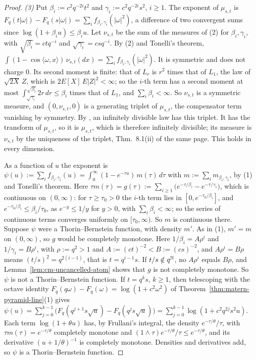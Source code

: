 \begin{proof}
\emph{(3)} Put $\beta_i := c^2q^{-2i}t^2$ and $\gamma_i := c^2q^{-2i}s^2$, $i \ge 1$. The exponent of
$\mu_{s,t}$ is $F_q(t|\omega|) - F_q(s|\omega|) = \sum_if_{\beta_i,\gamma_i}(|\omega|^2)$, a
difference of two convergent sums since $\log(1 + \beta_iu) \le \beta_iu$. Let $\nu_{s,t}$ be the
sum of the measures of (2) for $\beta_i, \gamma_i$, with $\sqrt{\beta_i} = ctq^{-i}$ and
$\sqrt{\gamma_i} = csq^{-i}$. By (2) and Tonelli's theorem,
$\int(1 - \cos\langle\omega, x\rangle)\,\nu_{s,t}(dx) = \sum_if_{\beta_i,\gamma_i}(|\omega|^2)$. It is
symmetric and does not charge $0$. Its second moment is finite: that of $L_r$ is $r^2$ times that of
$L_1$, the law of $\sqrt{2X}\,Z$, which is $2E[X]\,E|Z|^2 < \infty$; so the $i$-th term has a second
moment at most $\int_{\sqrt{\gamma_i}}^{\sqrt{\beta_i}}2r\,dr \le \beta_i$ times that of $L_1$, and
$\sum_i\beta_i < \infty$. So $\nu_{s,t}$ is a symmetric \Levy{} measure, and $(0, \nu_{s,t}, 0)$ is a
generating triplet of $\mu_{s,t}$, the compensator term vanishing by symmetry. By
, an infinitely divisible law has this
triplet. It has the transform of $\mu_{s,t}$, so it is $\mu_{s,t}$, which is therefore infinitely
divisible; its \Levy{} measure is $\nu_{s,t}$ by the uniqueness of the triplet, Thm.~8.1(ii) of the
same page. This holds in every dimension.

As a function of $u$ the exponent is $\psi(u) := \sum_if_{\beta_i,\gamma_i}(u) =
\int_0^\infty(1 - e^{-\tau u})\,m(\tau)\,d\tau$ with $m := \sum_im_{\beta_i,\gamma_i}$, by (1) and
Tonelli's theorem. Here $\tau m(\tau) = g(\tau) := \sum_{i \ge 1}\bigl(e^{-\tau/\beta_i} -
e^{-\tau/\gamma_i}\bigr)$, which is continuous on $(0, \infty)$: for $\tau \ge \tau_0 > 0$ the $i$-th
term lies in $[0, e^{-\tau_0/\beta_i}]$, and $e^{-\tau_0/\beta_i} \le \beta_i/\tau_0$, as
$e^{-y} \le 1/y$ for $y > 0$, with $\sum_i\beta_i < \infty$; so the series of continuous terms
converges uniformly on $[\tau_0, \infty)$. So $m$ is continuous there.
Suppose $\psi$ were a Thorin--Bernstein function, with density $m'$. As in (1), $m' = m$ on
$(0, \infty)$, so $g$ would be completely monotone. Here $1/\beta_i = A\rho^i$ and
$1/\gamma_i = B\rho^i$, with $\rho := q^2 > 1$ and $A := (ct)^{-2} < B := (cs)^{-2}$, and
$A\rho^i = B\rho$ means $(t/s)^2 = q^{2(i-1)}$, that is $t = q^{i-1}s$. If $t/s \notin q^{\mathbb{N}}$, no
$A\rho^i$ equals $B\rho$, and Lemma~\ref{lem:cm-uncancelled-atom} shows that $g$ is not completely
monotone. So $\psi$ is not a Thorin--Bernstein function. If $t = q^ks$, $k \ge 1$, then telescoping
with the octave identity $F_q(q\omega) - F_q(\omega) = \log(1 + c^2\omega^2)$ of
Theorem~\ref{thm:matern-pyramid-line}(1) gives
$\psi(u) = \sum_{j=0}^{k-1}\bigl(F_q(q^{j+1}s\sqrt u) - F_q(q^js\sqrt u)\bigr) =
\sum_{j=0}^{k-1}\log(1 + c^2q^{2j}s^2u)$. Each term $\log(1 + \theta u)$ has, by Frullani's integral,
the density $e^{-\tau/\theta}/\tau$, with $\tau m(\tau) = e^{-\tau/\theta}$ completely monotone and
$(1 \wedge \tau)e^{-\tau/\theta}/\tau \le e^{-\tau/\theta}$, and its derivative
$(u + 1/\theta)^{-1}$ is completely monotone. Densities and derivatives add, so $\psi$ is a
Thorin--Bernstein function.
\end{proof}

